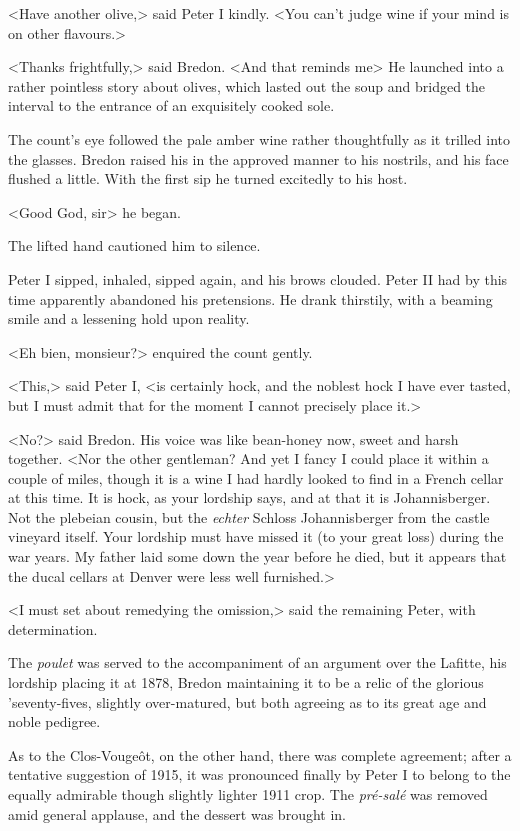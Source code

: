 <Have another olive,> said Peter I kindly. <You can't judge wine if your mind is on other flavours.>

<Thanks frightfully,> said Bredon. <And that reminds me\longdash> He launched into a rather pointless story about olives, which lasted out the soup and bridged the interval to the entrance of an exquisitely cooked sole.

The count's eye followed the pale amber wine rather thoughtfully as it trilled into the glasses. Bredon raised his in the approved manner to his nostrils, and his face flushed a little. With the first sip he turned excitedly to his host.

<Good God, sir\longdash> he began.

The lifted hand cautioned him to silence.

Peter I sipped, inhaled, sipped again, and his brows clouded. Peter II had by this time apparently abandoned his pretensions. He drank thirstily, with a beaming smile and a lessening hold upon reality.

<Eh bien, monsieur?> enquired the count gently.

<This,> said Peter I, <is certainly hock, and the noblest hock I have ever tasted, but I must admit that for the moment I cannot precisely place it.>

<No?> said Bredon. His voice was like bean-honey now, sweet and harsh together. <Nor the other gentleman? And yet I fancy I could place it within a couple of miles, though it is a wine I had hardly looked to find in a French cellar at this time. It is hock, as your lordship says, and at that it is Johannisberger. Not the plebeian cousin, but the \textit{echter} Schloss Johannisberger from the castle vineyard itself. Your lordship must have missed it (to your great loss) during the war years. My father laid some down the year before he died, but it appears that the ducal cellars at Denver were less well furnished.>

<I must set about remedying the omission,> said the remaining Peter, with determination.

The \textit{poulet} was served to the accompaniment of an argument over the Lafitte, his lordship placing it at 1878, Bredon maintaining it to be a relic of the glorious 'seventy-fives, slightly over-matured, but both agreeing as to its great age and noble pedigree.

As to the Clos-Vougeôt, on the other hand, there was complete agreement; after a tentative suggestion of 1915, it was pronounced finally by Peter I to belong to the equally admirable though slightly lighter 1911 crop. The \textit{pré-salé} was removed amid general applause, and the dessert was brought in.

